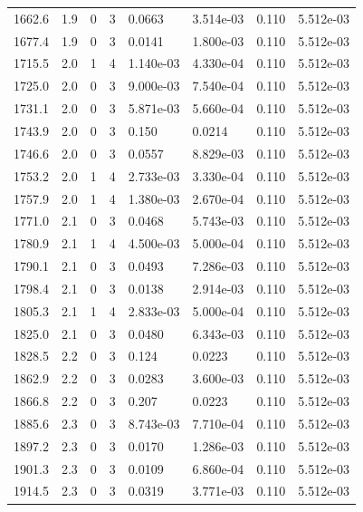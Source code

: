 \documentclass[preview]{standalone}
\begin{document}
{{{{{{\begin{tabular}{L{1.2cm}C{1.2cm} C{0.3cm}C{0.5cm} C{1.4cm}C{1.4cm} C{1.4cm}C{1.4cm}}
  1662.6  &   1.9  & 0     &  3 &  0.0663  & 3.514e-03  & 0.110 &  5.512e-03   \\ 
  1677.4  &   1.9  & 0     &  3 &  0.0141  & 1.800e-03  & 0.110 &  5.512e-03   \\ 
  1715.5  &   2.0  & 1     &  4 &  1.140e-03  & 4.330e-04  & 0.110 &  5.512e-03   \\ 
  1725.0  &   2.0  & 0     &  3 &  9.000e-03  & 7.540e-04  & 0.110 &  5.512e-03   \\ 
  1731.1  &   2.0  & 0     &  3 &  5.871e-03  & 5.660e-04  & 0.110 &  5.512e-03   \\ 
  1743.9  &   2.0  & 0     &  3 &  0.150  & 0.0214  & 0.110 &  5.512e-03   \\ 
  1746.6  &   2.0  & 0     &  3 &  0.0557  & 8.829e-03  & 0.110 &  5.512e-03   \\ 
  1753.2  &   2.0  & 1     &  4 &  2.733e-03  & 3.330e-04  & 0.110 &  5.512e-03   \\ 
  1757.9  &   2.0  & 1     &  4 &  1.380e-03  & 2.670e-04  & 0.110 &  5.512e-03   \\ 
  1771.0  &   2.1  & 0     &  3 &  0.0468  & 5.743e-03  & 0.110 &  5.512e-03   \\ 
  1780.9  &   2.1  & 1     &  4 &  4.500e-03  & 5.000e-04  & 0.110 &  5.512e-03   \\ 
  1790.1  &   2.1  & 0     &  3 &  0.0493  & 7.286e-03  & 0.110 &  5.512e-03   \\ 
  1798.4  &   2.1  & 0     &  3 &  0.0138  & 2.914e-03  & 0.110 &  5.512e-03   \\ 
  1805.3  &   2.1  & 1     &  4 &  2.833e-03  & 5.000e-04  & 0.110 &  5.512e-03   \\ 
  1825.0  &   2.1  & 0     &  3 &  0.0480  & 6.343e-03  & 0.110 &  5.512e-03   \\ 
  1828.5  &   2.2  & 0     &  3 &  0.124  & 0.0223  & 0.110 &  5.512e-03   \\ 
  1862.9  &   2.2  & 0     &  3 &  0.0283  & 3.600e-03  & 0.110 &  5.512e-03   \\ 
  1866.8  &   2.2  & 0     &  3 &  0.207  & 0.0223  & 0.110 &  5.512e-03   \\ 
  1885.6  &   2.3  & 0     &  3 &  8.743e-03  & 7.710e-04  & 0.110 &  5.512e-03   \\ 
  1897.2  &   2.3  & 0     &  3 &  0.0170  & 1.286e-03  & 0.110 &  5.512e-03   \\ 
  1901.3  &   2.3  & 0     &  3 &  0.0109  & 6.860e-04  & 0.110 &  5.512e-03   \\ 
  1914.5  &   2.3  & 0     &  3 &  0.0319  & 3.771e-03  & 0.110 &  5.512e-03   \\ 

\end{tabular}}}}}}}
\end{document}

